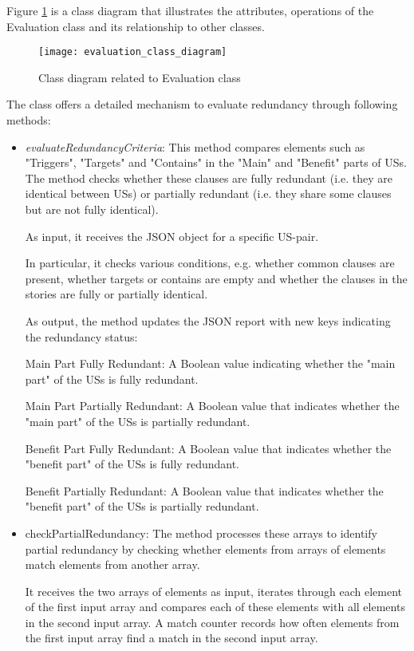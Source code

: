 Figure \ref{fig:evaluation_class_diagram} is a class diagram that illustrates the attributes, operations of the Evaluation class and its relationship to other classes.
\begin{figure}[h]
	\centering 
	\texttt{[image: evaluation\_class\_diagram]}
	\caption{Class diagram related to Evaluation class}\label{fig:evaluation_class_diagram}
\end{figure} 
The class offers a detailed mechanism to evaluate redundancy through following methods:
\begin{itemize}
	\item\textit{evaluateRedundancyCriteria}: This method compares elements such as "Triggers", "Targets" and "Contains" in the "Main" and "Benefit" parts of USs. The method checks whether these clauses are fully redundant (i.e. they are identical between USs) or partially redundant (i.e. they share some clauses but are not fully identical).
	
	As input, it receives the JSON object for a specific US-pair.
	
	In particular, it checks various conditions, e.g. whether common clauses are present, whether targets or contains are empty and whether the clauses in the stories are fully or partially identical.
	
	As output, the method updates the JSON report with new keys indicating the redundancy status:
	
	Main Part Fully Redundant: A Boolean value indicating whether the "main part" of the USs is fully redundant.
	
	Main Part Partially Redundant: A Boolean value that indicates whether the "main part" of the USs is partially redundant.
	
	Benefit Part Fully Redundant: A Boolean value that indicates whether the "benefit part" of the USs is fully redundant.
	
	Benefit Partially Redundant: A Boolean value that indicates whether the "benefit part" of the USs is partially redundant.
	
	\item checkPartialRedundancy: The method processes these arrays to identify partial redundancy by checking whether elements from arrays of elements match elements from another array. 
	
	It receives the two arrays of elements as input, iterates through each element of the first input array and compares each of these elements with all elements in the second input array. A match counter records how often elements from the first input array find a match in the second input array.
	

\end{itemize}
